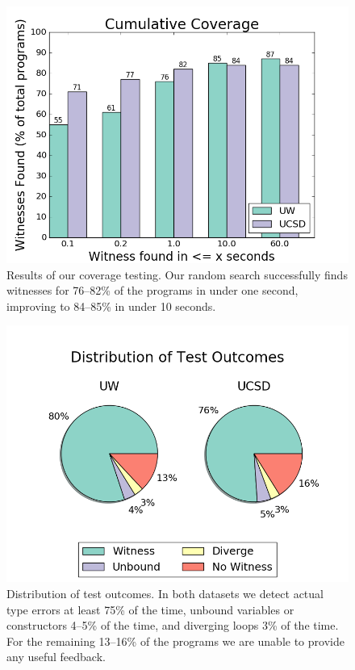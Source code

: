 \begin{figure}[t]
\centering
\includegraphics[width=0.7\linewidth]{nanomaly/coverage.png}
\caption{Results of our coverage testing. Our random search successfully
  finds witnesses for 76--82\% of the programs in under one second,
  improving to 84--85\% in under 10 seconds. }
\label{fig:results-witness}
\end{figure}
\begin{figure}[t]
\includegraphics[width=0.7\linewidth]{nanomaly/distrib.png}
\caption{Distribution of test outcomes. In both datasets we detect
  actual type errors at least 75\% of the time, unbound variables or
  constructors 4--5\% of the time, and diverging loops 3\% of the
  time. For the remaining 13--16\% of the programs we are unable to
  provide any useful feedback. }
\label{fig:results-distrib}
\end{figure}



